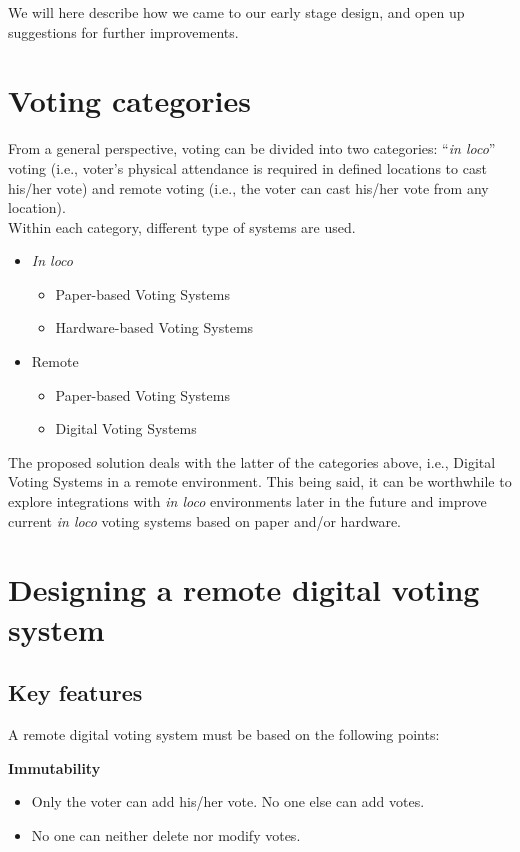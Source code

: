 \documentclass[10pt, letterpaper]{article}
\begin{document}
We will here describe how we came to our early stage design, and open up suggestions for further improvements.

\section{Voting categories}
From a general perspective, voting can be divided into two categories: “\textit{in loco}” voting (i.e., voter's physical attendance is required in defined locations to cast his/her vote) and remote voting (i.e., the voter can cast his/her vote from any location).\\ 
Within each category, different type of systems are used.
\begin{itemize}
\item \textit{In loco}
    \begin{itemize}
    \item Paper-based Voting Systems
    \item Hardware-based Voting Systems
    \end{itemize}
\item Remote
    \begin{itemize}
    \item Paper-based Voting Systems
    \item Digital Voting Systems
    \end{itemize}
\end{itemize}

The proposed solution deals with the latter of the categories above, i.e., Digital Voting Systems in a remote environment. This being said, it can be worthwhile to explore integrations with \textit{in loco} environments later in the future and improve current \textit{in loco} voting systems based on paper and/or hardware.

\section{Designing a remote digital voting system}
\subsection{Key features}
A remote digital voting system must be based on the following points:
\bigskip

\textbf{Immutability}
\begin{itemize}
\item Only the voter can add his/her vote. No one else can add votes.
\item No one can neither delete nor modify votes.
\end{itemize}
\bigskip
\end{document}
